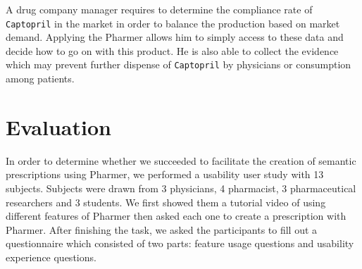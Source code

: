 \documentclass[conference]{IEEEtran}
\begin{document}
 A drug company manager requires to determine the compliance rate of \texttt{Captopril} in the market in order to balance the production based on market demand.
 Applying the Pharmer allows him to simply access to these data and decide how to go on with this product.
 He is also able to collect the evidence which may prevent further dispense of \texttt{Captopril} by physicians or consumption among patients.


\section{Evaluation}
\label{sec:evaluation}
In order to determine whether we succeeded to facilitate the creation of semantic prescriptions using Pharmer, we performed a usability user study with 13 subjects.
Subjects were drawn from 3 physicians, 4 pharmacist, 3 pharmaceutical researchers and 3 students.
We first showed them a tutorial video of using different features of Pharmer then asked each one to create a prescription with Pharmer.
After finishing the task, we asked the participants to fill out a questionnaire which consisted of two parts: feature usage questions and usability experience questions.
\end{document}
